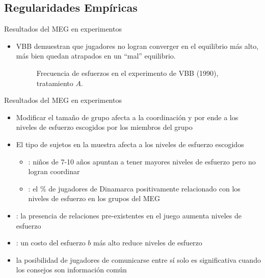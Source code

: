 \documentclass[t,9pt,xcolor=dvipsnames]{beamer}
\begin{document}
\subsection{Regularidades Empíricas}
\begin{frame}{Resultados del MEG en experimentos}
\begin{itemize}
        \item VBB \parencite*{vanHuyck.1990} demuestran que jugadores no logran converger en el equilibrio más alto, más bien quedan atrapados en un ``mal'' equilibrio.
         \begin{figure}[H]
 \centering
       \caption{Frecuencia de esfuerzos en el experimento de VBB (1990), tratamiento $A$.}
 \end{figure}
\end{itemize}
   \end{frame}
   \begin{frame}{Resultados del MEG en experimentos}
   \begin{itemize}
   \item Modificar el tamaño de grupo afecta a la coordinación y por ende a los niveles de esfuerzo escogidos por los miembros del grupo
   \item El tipo de sujetos en la muestra afecta a los niveles de esfuerzo escogidos
   \begin{itemize}
       \item \textcite{Weidenholzer.12282012}: niños de 7-10 años apuntan a tener mayores niveles de esfuerzo pero no logran coordinar
       \item \textcite{Engelmann.2010}: el \% de jugadores de Dinamarca positivamente relacionado con los niveles de esfuerzo en los grupos del MEG
         \end{itemize}
             \item \textcite{Gachter.2015}: la presencia de relaciones pre-existentes en el juego aumenta niveles de esfuerzo
       \item \textcite{Holt.2007}: un costo del esfuerzo $b$ más alto reduce niveles de esfuerzo
       \item \textcite{Chaudhuri.2009} la posibilidad de jugadores de comunicarse entre sí solo es significativa cuando los consejos son información común
   \end{itemize}
     \end{frame}
\end{document}
